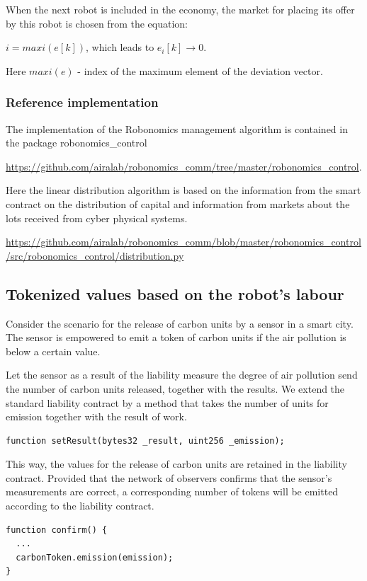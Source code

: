 \documentclass{article}
\begin{document}
When the next robot is included in the economy, the market for placing its offer by this robot is chosen from the equation:

$ i = maxi(e[k])$, which leads to $ e_i[k] \rightarrow 0 $.

Here  $ maxi(e) $ - index of the maximum element of the deviation vector.

\subsubsection{Reference implementation}

The implementation of the Robonomics management algorithm is contained in the package robonomics\_control

\url{https://github.com/airalab/robonomics_comm/tree/master/robonomics_control}. 

Here the linear distribution algorithm is based on the information from the smart contract on the distribution of capital and information from markets about the lots received from cyber physical systems.

\url{https://github.com/airalab/robonomics_comm/blob/master/robonomics_control/src/robonomics_control/distribution.py}

\subsection{Tokenized values based on the robot’s labour}

Consider the scenario for the release of carbon units by a sensor in a smart city. The sensor is empowered to emit a token of carbon units if the air pollution is below a certain value.

Let the sensor as a result of the liability measure the degree of air pollution send the number of carbon units released, together with the results. We extend the standard liability contract by a method that takes the number of units for emission together with the result of work.
\begin{lstlisting}
function setResult(bytes32 _result, uint256 _emission);
\end{lstlisting}


This way, the values for the release of carbon units are retained in the liability contract. Provided that the network of observers confirms that the sensor’s measurements are correct, a corresponding number of tokens will be emitted according to the liability contract.

\begin{lstlisting}
function confirm() {
  ... 
  carbonToken.emission(emission);
}
\end{lstlisting}
\end{document}
